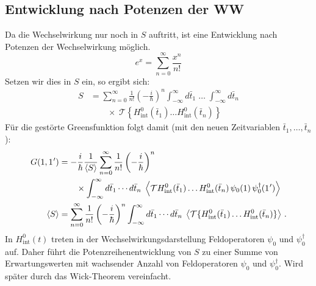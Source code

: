 \subsection{Entwicklung nach Potenzen der WW}

Da die Wechselwirkung nur noch in $S$ auftritt, ist eine Entwicklung nach Potenzen der Wechselwirkung möglich.
\begin{equation}
  e^{x} = \sum_{n=0}^{\infty} \frac{x^{n}}{n!}
\end{equation}
Setzen wir dies in $S$ ein, so ergibt sich:
\begin{equation}
  \begin{aligned}
    S & = \sum_{n=0}^{\infty} \frac{1}{n!}\left(-\frac{i}{\hbar}\right)^{n} \int_{-\infty}^{\infty} d\bar t_{1}\;\ldots\;\int_{-\infty}^{\infty} d\bar t_{n} \\
      & \qquad\times\; \mathcal{T}\left\{H_{\mathrm{int}}^{0}(\bar t_{1})\ldots H_{\mathrm{int}}^{0}(\bar t_{n})\right\}
  \end{aligned}
\end{equation}
Für die gestörte Greensfunktion folgt damit (mit den neuen Zeitvariablen $\bar t_{1},\ldots,\bar t_{n}$):
\begin{equation}
  \begin{aligned}
    G(1,1\mkern1mu') & = -\frac{i}{\hbar}\frac{1}{\left\langle S\right\rangle}\sum_{n=0}^{\infty} \frac{1}{n!}\left(-\frac{i}{\hbar}\right)^{n}                                                                                                                       \\
                     & \qquad\times\int_{-\infty}^{\infty} d\bar t_{1}\cdots d\bar t_{n}\;\left\langle\mathcal{T}H_{\mathrm{int}}^{0}(\bar t_{1})\ldots H_{\mathrm{int}}^{0}(\bar t_{n})\,\psi_{0}(1)\,\psi_{0}^{\dagger}(1\mkern1mu')\right\rangle                  \\
    \left\langle S\right\rangle          & = \sum_{n=0}^{\infty} \frac{1}{n!}\left(-\frac{i}{\hbar}\right)^{n} \int_{-\infty}^{\infty} d\bar t_{1}\cdots d\bar t_{n}\;\left\langle\mathcal{T}\{H_{\mathrm{int}}^{0}(\bar t_{1})\ldots H_{\mathrm{int}}^{0}(\bar t_{n})\}\right\rangle\,.
  \end{aligned}
\end{equation}
In $H_{\mathrm{int}}^{0}(t)$ treten in der Wechselwirkungsdarstellung Feldoperatoren $\psi_{0}$ und $\psi_{0}^{\dagger}$ auf. Daher führt die Potenzreihenentwicklung von $S$ zu einer Summe von Erwartungswerten mit wachsender Anzahl von Feldoperatoren $\psi_{0}$ und $\psi_{0}^{\dagger}$. Wird später durch das Wick-Theorem vereinfacht.

